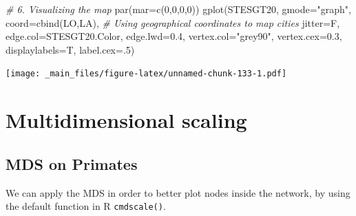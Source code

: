 \documentclass[
  notitlepage,
  onecolumn,
  openany]{book}
\newenvironment{Shaded}{\begin{snugshade}}{\end{snugshade}}
\newcommand{\AttributeTok}[1]{\textcolor[rgb]{0.77,0.63,0.00}{#1}}
\newcommand{\CommentTok}[1]{\textcolor[rgb]{0.56,0.35,0.01}{\textit{#1}}}
\newcommand{\DecValTok}[1]{\textcolor[rgb]{0.00,0.00,0.81}{#1}}
\newcommand{\FloatTok}[1]{\textcolor[rgb]{0.00,0.00,0.81}{#1}}
\newcommand{\FunctionTok}[1]{\textcolor[rgb]{0.00,0.00,0.00}{#1}}
\newcommand{\NormalTok}[1]{#1}
\newcommand{\StringTok}[1]{\textcolor[rgb]{0.31,0.60,0.02}{#1}}
\begin{document}
\begin{Shaded}
\begin{Highlighting}[]
\CommentTok{\# 6. Visualizing the map}
\FunctionTok{par}\NormalTok{(}\AttributeTok{mar=}\FunctionTok{c}\NormalTok{(}\DecValTok{0}\NormalTok{,}\DecValTok{0}\NormalTok{,}\DecValTok{0}\NormalTok{,}\DecValTok{0}\NormalTok{))}
\FunctionTok{gplot}\NormalTok{(STESGT20, }
      \AttributeTok{gmode=}\StringTok{"graph"}\NormalTok{,}
      \AttributeTok{coord=}\FunctionTok{cbind}\NormalTok{(LO,LA), }\CommentTok{\# Using geographical coordinates to map cities}
      \AttributeTok{jitter=}\NormalTok{F,}
      \AttributeTok{edge.col=}\NormalTok{STESGT20.Color,}
      \AttributeTok{edge.lwd=}\FloatTok{0.4}\NormalTok{,}
      \AttributeTok{vertex.col=}\StringTok{"grey90"}\NormalTok{,}
      \AttributeTok{vertex.cex=}\FloatTok{0.3}\NormalTok{,}
      \AttributeTok{displaylabels=}\NormalTok{T, }
      \AttributeTok{label.cex=}\NormalTok{.}\DecValTok{5}\NormalTok{)}
\end{Highlighting}
\end{Shaded}

\texttt{[image: \_main\_files/figure-latex/unnamed-chunk-133-1.pdf]}

\hypertarget{multidimensional-scaling}{%
\section{Multidimensional scaling}\label{multidimensional-scaling}}

\hypertarget{mds-on-primates}{%
\subsection{MDS on Primates}\label{mds-on-primates}}

We can apply the MDS in order to better plot nodes inside the network, by using the default function in R \texttt{cmdscale()}.
\end{document}
